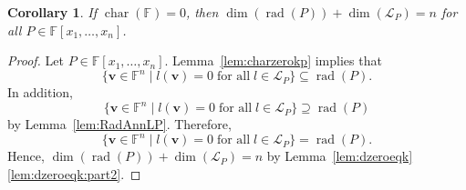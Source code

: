 \documentclass{elsarticle}
\def\ucsign{\bcpanchant}
\newenvironment{underconst}{\begin{mybox}\par\noindent\hangindent=2em\hangafter=-2
  \smash{\hbox to0pt{\hskip-\hangindent
    \lower1.5\baselineskip\hbox{\ucsign}\hfill}}
    }{\end{mybox}}
\DeclareMathOperator{\Char}{char}
\DeclareMathOperator{\rad}{rad}
\def\F{{\mathbb F}}
\newtheorem{lemma}[theorem]{Lemma}
\newtheorem{corollary}[theorem]{Corollary}
\theoremstyle{definition}
\numberwithin{equation}{section}
\begin{document}
%
%

\begin{corollary}\label{cor:charzerokp}If $\Char (\F) = 0$, then $\dim (\rad(P)) + \dim (\mathcal L_P) = n$ for all $P \in \F[x_1,\ldots, x_n]$.
\end{corollary}
\begin{proof}
Let $P \in \F[x_1,\ldots, x_n]$. Lemma~\ref{lem:charzerokp} implies that 
$$
\{\mathbf v \in \F^n \mid l(\mathbf v) = 0\;\mbox{for all} \;l \in \mathcal L_P\} \subseteq \rad(P).
$$
In addition,
$$
\{\mathbf v \in \F^n \mid l(\mathbf v) = 0\;\mbox{for all} \;l \in \mathcal L_P\} \supseteq \rad(P)
$$
by Lemma~\ref{lem:RadAnnLP}. Therefore,
$$
\{\mathbf v \in \F^n \mid l(\mathbf v) = 0\;\mbox{for all} \;l \in \mathcal L_P\} = \rad(P).
$$
Hence, $\dim (\rad(P)) + \dim (\mathcal L_P) = n$ by Lemma~\ref{lem:dzeroeqk}\ref{lem:dzeroeqk:part2}.
\end{proof}
\end{document}
